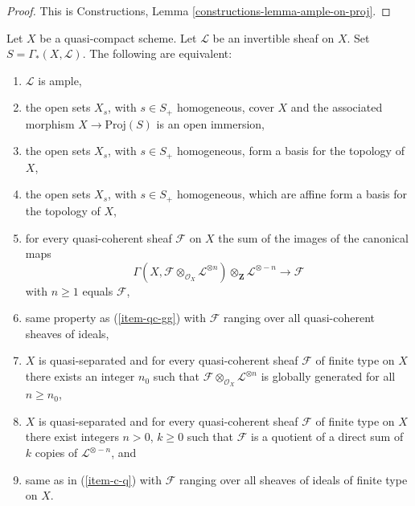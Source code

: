 \begin{proof}
This is Constructions, Lemma \ref{constructions-lemma-ample-on-proj}.
\end{proof}

\begin{proposition}
\label{proposition-characterize-ample}
Let $X$ be a quasi-compact scheme.
Let $\mathcal{L}$ be an invertible sheaf on $X$.
Set $S = \Gamma_*(X, \mathcal{L})$.
The following are equivalent:
\begin{enumerate}
\item
\label{item-ample}
$\mathcal{L}$ is ample,
\item
\label{item-immersion}
the open sets $X_s$, with $s \in S_{+}$ homogeneous,
cover $X$ and the associated morphism $X \to \text{Proj}(S)$
is an open immersion,
\item
\label{item-s-basis}
the open sets $X_s$, with $s \in S_{+}$ homogeneous,
form a basis for the topology of $X$,
\item
\label{item-s-affine-basis}
the open sets $X_s$, with $s \in S_{+}$ homogeneous,
which are affine form a basis for the topology of $X$,
\item
\label{item-qc-gg}
for every quasi-coherent sheaf $\mathcal{F}$ on $X$
the sum of the images of the canonical maps
$$
\Gamma(X, \mathcal{F} \otimes_{\mathcal{O}_X} \mathcal{L}^{\otimes n})
\otimes_{\mathbf{Z}} \mathcal{L}^{\otimes -n}
\longrightarrow
\mathcal{F}
$$
with $n \geq 1$ equals $\mathcal{F}$,
\item
\label{item-qc-i-gg}
same property as (\ref{item-qc-gg}) with $\mathcal{F}$
ranging over all quasi-coherent sheaves of ideals,
\item
\label{item-c-gg}
$X$ is quasi-separated and
for every quasi-coherent sheaf $\mathcal{F}$ of finite type on $X$
there exists an integer $n_0$ such that
$\mathcal{F} \otimes_{\mathcal{O}_X} \mathcal{L}^{\otimes n}$
is globally generated for all $n \geq n_0$,
\item
\label{item-c-q}
$X$ is quasi-separated and
for every quasi-coherent sheaf $\mathcal{F}$ of finite type on $X$
there exist integers $n > 0$, $k \geq 0$ such that
$\mathcal{F}$ is a quotient of a direct sum of $k$ copies of
$\mathcal{L}^{\otimes - n}$, and
\item
\label{item-c-i-q}
same as in (\ref{item-c-q}) with $\mathcal{F}$ ranging over all
sheaves of ideals of finite type on $X$.
\end{enumerate}
\end{proposition}

